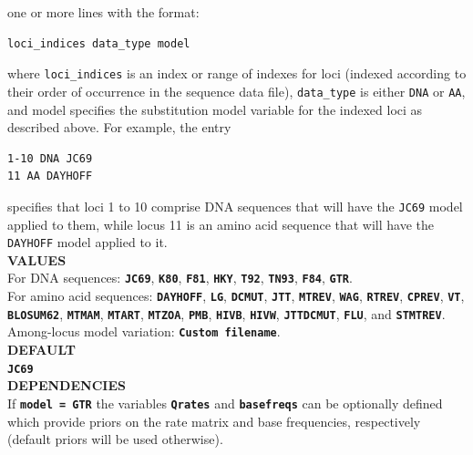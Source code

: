 \documentclass{book}
\numberwithin{equation}{section} \renewcommand{\baselinestretch}{0.55}
\begin{document}
one or more lines with the format:
\begin{verbatim}
loci_indices data_type model
\end{verbatim}
where \texttt{loci\_indices} is an index or range of indexes for loci (indexed according to their order of occurrence in the sequence data file),
\texttt{data\_type} is either \texttt{DNA} or \texttt{AA}, and model specifies the substitution model variable for the indexed loci as described above.
For example, the entry
\begin{verbatim}
1-10 DNA JC69
11 AA DAYHOFF
\end{verbatim}
specifies that loci 1 to 10 comprise DNA sequences that will have the \texttt{JC69} model applied to them, while locus 11 is an amino acid sequence
that will have the \texttt{DAYHOFF} model applied to it.
\vspace{5pt}\\
\textbf{VALUES} \vspace{5pt}\\
For DNA sequences: \textbf{\texttt{JC69}}, \textbf{\texttt{K80}}, \textbf{\texttt{F81}}, \textbf{\texttt{HKY}}, \textbf{\texttt{T92}},
\textbf{\texttt{TN93}}, \textbf{\texttt{F84}}, \textbf{\texttt{GTR}}. \vspace{5pt}\\
For amino acid sequences: \textbf{\texttt{DAYHOFF}}, \textbf{\texttt{LG}}, \textbf{\texttt{DCMUT}}, \textbf{\texttt{JTT}}, \textbf{\texttt{MTREV}},
\textbf{\texttt{WAG}}, \textbf{\texttt{RTREV}}, \textbf{\texttt{CPREV}}, \textbf{\texttt{VT}}, \textbf{\texttt{BLOSUM62}}, \textbf{\texttt{MTMAM}},
\textbf{\texttt{MTART}}, \textbf{\texttt{MTZOA}}, \textbf{\texttt{PMB}}, \textbf{\texttt{HIVB}}, \textbf{\texttt{HIVW}}, \textbf{\texttt{JTTDCMUT}},
\textbf{\texttt{FLU}}, and \textbf{\texttt{STMTREV}}. \vspace{5pt}\\
Among-locus model variation: \textbf{\texttt{Custom filename}}. \vspace{5pt}\\
\textbf{DEFAULT} \vspace{5pt}\\
\textbf{\texttt{JC69}} \vspace{5pt}\\
\textbf{DEPENDENCIES} \vspace{5pt}\\
If \textbf{\texttt{model = GTR}} the variables \textbf{\texttt{Qrates}}
and \textbf{\texttt{basefreqs}} can be optionally defined which provide priors on the rate matrix and base frequencies, respectively (default priors will be used otherwise).
\end{document}
